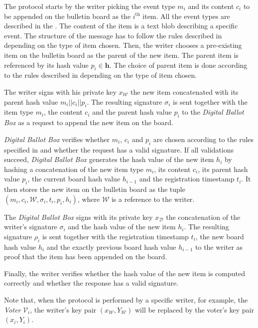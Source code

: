 The protocol starts by the writer picking the event type $m_i$ and its content $c_i$ to be appended on the bulletin board as the $i^\mathrm{th}$ item. All the event types are described in the . The content of the item is a text blob describing a specific event. The structure of the message has to follow the rules described in  depending on the type of item chosen. Then, the writer chooses a pre-existing item on the bulletin board as the parent of the new item. The parent item is referenced by its hash value $p_i \in \boldsymbol{h}$. The choice of parent item is done according to the rules described in  depending on the type of item chosen.

The writer signs with his private key $x_\mathcal{W}$ the new item concatenated with its parent hash value $m_i || c_i || p_i$. The resulting signature $\sigma_i$ is sent together with the item type $m_i$, the content $c_i$ and the parent hash value $p_i$ to the \textit{Digital Ballot Box} as a request to append the new item on the board.

\textit{Digital Ballot Box} verifies whether $m_i$, $c_i$ and $p_i$ are chosen according to the rules specified in  and whether the request has a valid signature. If all validations succeed, \textit{Digital Ballot Box} generates the hash value of the new item $h_i$ by hashing a concatenation of the new item type $m_i$, its content $c_i$, its parent hash value $p_i$, the current board hash value $h_{i-1}$ and the registration timestamp $t_i$. It then stores the new item on the bulletin board as the tuple $(m_i, c_i, \mathcal{W}, \sigma_i, t_i, p_i, h_i)$, where $\mathcal{W}$ is a reference to the writer.

The \textit{Digital Ballot Box} signs with its private key $x_\mathcal{D}$ the concatenation of the writer's signature $\sigma_i$ and the hash value of the new item $h_i$. The resulting signature $\rho_i$ is sent together with the registration timestamp $t_i$, the new board hash value $h_i$ and the exactly previous board hash value $h_{i-1}$ to the writer as proof that the item has been appended on the board.

Finally, the writer verifies whether the hash value of the new item is computed correctly and whether the response has a valid signature.

Note that, when the protocol is performed by a specific writer, for example, the \textit{Voter} $\mathcal{V}_i$, the writer's key pair $(x_\mathcal{W}, Y_\mathcal{W})$ will be replaced by the voter's key pair $(x_i, Y_i)$.

